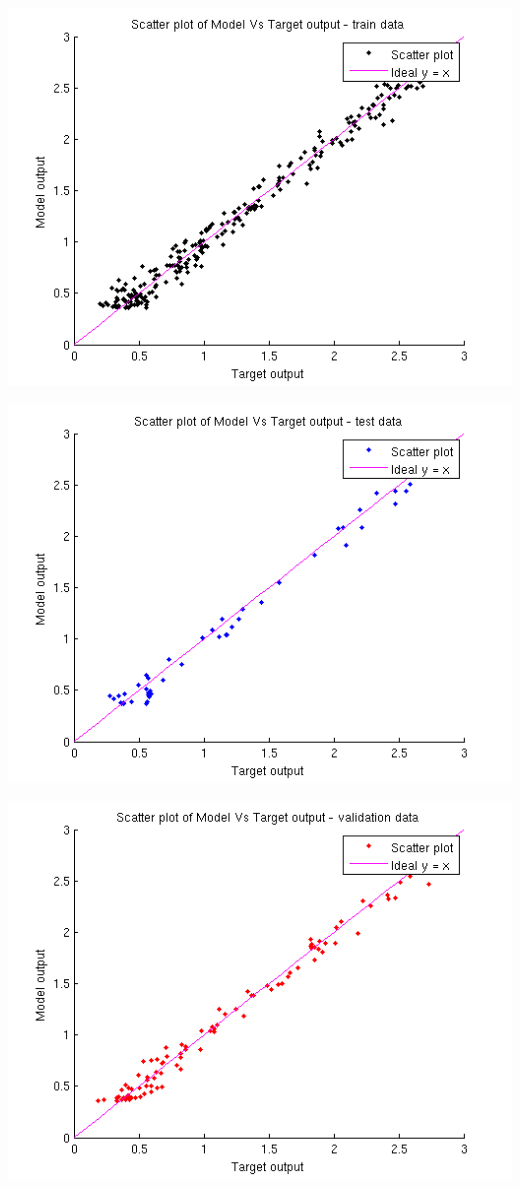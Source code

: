 \documentclass{article}
\begin{document}
\begin{center}
\includegraphics[scale=0.6]{Regression/scatter_train}
\end{center}
\begin{center}
\includegraphics[scale=0.6]{Regression/scatter_test}
\end{center}
\begin{center}
\includegraphics[scale=0.6]{Regression/scatter_val}
\end{center}
\end{document}
